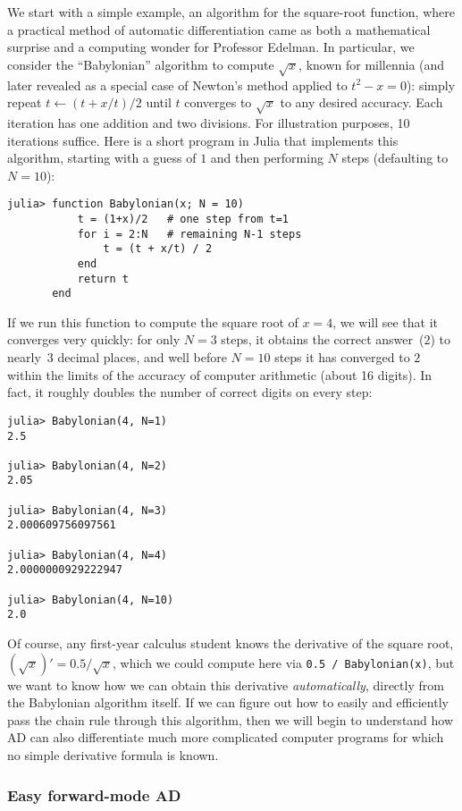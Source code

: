 We start with a simple example, an algorithm for the square-root function, where a practical method of automatic differentiation came as both a mathematical surprise and a computing wonder for Professor Edelman. In particular, we consider the ``Babylonian'' algorithm to compute $\sqrt{x}$, known for millennia (and later revealed as a special case of Newton's method applied to $t^2 - x = 0$): simply repeat $t \leftarrow (t + x/t)/2$ until $t$ converges to $\sqrt{x}$ to any desired accuracy. Each iteration has one addition and two divisions. For illustration purposes, 10 iterations suffice.    Here is a short program in Julia that implements this algorithm, starting with a guess of $1$ and then performing $N$ steps (defaulting to $N=10$):
\begin{verbatim}
julia> function Babylonian(x; N = 10) 
           t = (1+x)/2   # one step from t=1
           for i = 2:N   # remaining N-1 steps
               t = (t + x/t) / 2
           end    
           return t
       end
\end{verbatim}
If we run this function to compute the square root of $x=4$, we will see that it converges very quickly: for only $N=3$ steps, it obtains the correct answer~($2$) to nearly~3 decimal places, and well before $N=10$ steps it has converged to $2$ within the limits of the accuracy of computer arithmetic (about 16 digits).  In fact, it roughly doubles the number of correct digits on every step:
\begin{verbatim}
julia> Babylonian(4, N=1)
2.5

julia> Babylonian(4, N=2)
2.05

julia> Babylonian(4, N=3)
2.000609756097561

julia> Babylonian(4, N=4)
2.0000000929222947

julia> Babylonian(4, N=10)
2.0
\end{verbatim}


Of course, any first-year calculus student knows the derivative of the square root, $(\sqrt{x})' = 0.5/\sqrt{x}$, which we could compute here via \texttt{0.5 / Babylonian(x)},
but we want to know how we can obtain this derivative \emph{automatically}, directly from the Babylonian algorithm itself.  If we can figure out how to easily and efficiently pass the chain rule through this algorithm, then we will begin to understand how AD can also differentiate much more complicated computer programs for which no simple derivative formula is known.

\subsubsection{Easy forward-mode AD}

